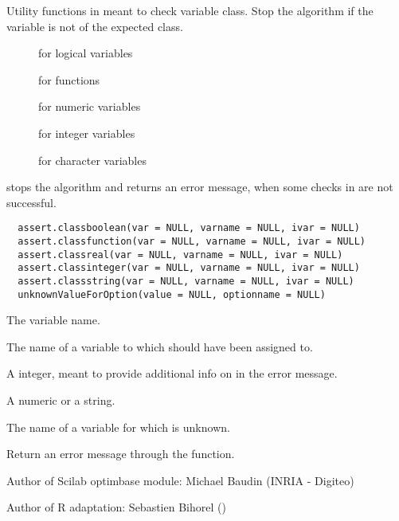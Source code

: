 %
\begin{Description}\relax
Utility functions in  meant to check variable class. Stop the
algorithm if the variable is not of the expected class.\begin{description}

\item[] for logical variables
\item[] for functions
\item[] for numeric variables
\item[] for integer variables
\item[] for character variables

\end{description}

 stops the algorithm and returns an error
message, when some checks in  are not successful.
\end{Description}
%
\begin{Usage}
\begin{verbatim}
  assert.classboolean(var = NULL, varname = NULL, ivar = NULL)
  assert.classfunction(var = NULL, varname = NULL, ivar = NULL)
  assert.classreal(var = NULL, varname = NULL, ivar = NULL)
  assert.classinteger(var = NULL, varname = NULL, ivar = NULL)
  assert.classstring(var = NULL, varname = NULL, ivar = NULL)
  unknownValueForOption(value = NULL, optionname = NULL)
\end{verbatim}
\end{Usage}
%
\begin{Arguments}
\begin{ldescription}
\item[\code{var}] The variable name.
\item[\code{varname}] The name of a variable to which  should have been
assigned to.
\item[\code{ivar}] A integer, meant to provide additional info on  in
the error message.
\item[\code{value}] A numeric or a string.
\item[\code{optionname}] The name of a variable for which  is unknown.
\end{ldescription}
\end{Arguments}
%
\begin{Value}
Return an error message through the  function.
\end{Value}
%
\begin{Author}\relax
Author of Scilab optimbase module: Michael Baudin (INRIA - Digiteo)

Author of R adaptation: Sebastien Bihorel ()
\end{Author}
